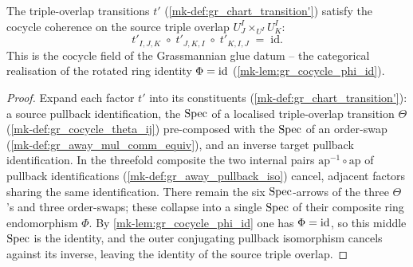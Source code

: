 \begin{lemma}\label{mk-lem:gr_chartTransition'_cocycle}
  \leanok

  The triple-overlap transitions \(t'\) (\ref{mk-def:gr_chart_transition'}) satisfy
  the cocycle coherence on the source triple overlap \(U^I_J \times_{U^I} U^I_K\):
  \[
    t'_{I,J,K} \;\circ\; t'_{J,K,I} \;\circ\; t'_{K,I,J} \;=\; \mathrm{id}.
  \]
  This is the \(\mathrm{cocycle}\) field of the Grassmannian glue datum -- the
  categorical realisation of the rotated ring identity \(\Phi = \operatorname{id}\)
  (\ref{mk-lem:gr_cocycle_phi_id}).
\end{lemma}
\begin{proof}
  \leanok
  Expand each factor \(t'\) into its constituents
  (\ref{mk-def:gr_chart_transition'}): a source pullback identification, the
  \(\operatorname{Spec}\) of a localised triple-overlap transition \(\Theta\)
  (\ref{mk-def:gr_cocycle_theta_ij}) pre-composed with the \(\operatorname{Spec}\) of an
  order-swap (\ref{mk-def:gr_away_mul_comm_equiv}), and an inverse target pullback
  identification. In the threefold composite the two internal pairs
  \(\mathrm{ap}^{-1} \circ \mathrm{ap}\) of pullback identifications
  (\ref{mk-def:gr_away_pullback_iso}) cancel, adjacent factors sharing the same
  identification. There remain the six \(\operatorname{Spec}\)-arrows of the three \(\Theta\)'s
  and three order-swaps; these collapse into a single \(\operatorname{Spec}\) of their composite
  ring endomorphism \(\Phi\). By \ref{mk-lem:gr_cocycle_phi_id} one has
  \(\Phi = \operatorname{id}\), so this middle \(\operatorname{Spec}\) is the identity, and the outer
  conjugating pullback isomorphism cancels against its inverse, leaving the
  identity of the source triple overlap.
\end{proof}


